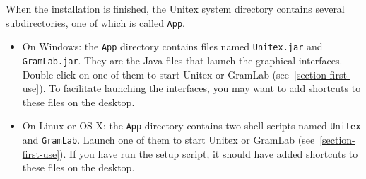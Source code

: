 \bigskip
\noindent When the installation is finished, the Unitex system directory contains several
subdirectories,  one  of which is called \verb+App+.
\begin{itemize}
\item On Windows: the \verb+App+ directory contains files named
\verb+Unitex.jar+ and \verb+GramLab.jar+. They are the Java files that
launch the graphical interfaces. Double-click on one of them to start Unitex or GramLab
(see~\ref{section-first-use}). To facilitate launching the interfaces, you may want to add shortcuts
to these files on the desktop.
\item On Linux or OS X: the \verb+App+ directory contains two
shell scripts named \verb+Unitex+ and \verb+GramLab+. Launch one of them
to start Unitex or GramLab (see~\ref{section-first-use}). If you have run the setup script, it should have added
shortcuts to these files on the desktop.
\end{itemize}




 





